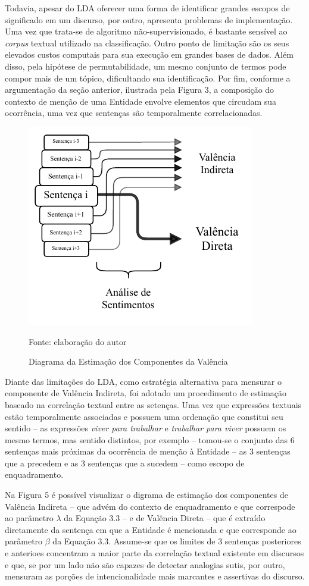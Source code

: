 \documentclass[
12pt,				%
openright,			%
twoside,			%
a4paper,			%
english,			%
french,				%
spanish,			%
brazil				%
]{abntex2}
\begin{document}
Todavia, apesar do LDA oferecer uma forma de identificar grandes escopos de significado em um discurso, por outro, apresenta problemas de implementação. Uma vez que trata-se de algoritmo não-supervisionado, é bastante sensível ao \emph{corpus} textual utilizado na classificação. Outro ponto de limitação são os seus elevados custos computais para sua execução em grandes bases de dados. Além disso, pela hipótese de permutabilidade, um mesmo conjunto de termos pode compor mais de um tópico, dificultando sua identificação. Por fim, conforme a argumentação da seção anterior, ilustrada pela Figura 3, a composição do contexto de menção de uma Entidade envolve elementos que circudam sua ocorrência, uma vez que sentenças são temporalmente correlacionadas. 
 
\begin{figure}[h]
	\caption{Diagrama da Estimação dos Componentes da Valência}
	\label{fig:diagram_op}
	\centering
	\includegraphics[width=0.5\linewidth]{figures/estimacao_valencia}
	
	Fonte: elaboração do autor
\end{figure}
 
Diante das limitações do LDA, como estratégia alternativa para mensurar o componente de Valência Indireta, foi adotado um procedimento de estimação baseado na correlação textual entre as setenças. Uma vez que expressões textuais estão temporalmente associadas e possuem uma ordenação que constitui seu sentido -- as expressões \textit{viver para trabalhar} e \textit{trabalhar para viver} possuem os mesmo termos, mas sentido distintos, por exemplo -- tomou-se o conjunto das 6 sentenças mais próximas da ocorrência de menção à Entidade -- as 3 sentenças que a precedem e as 3 sentenças que a sucedem -- como escopo de enquadramento. 

Na Figura 5 é possível visualizar o digrama de estimação dos componentes de Valência Indireta -- que advém do contexto de enquadramento e que correspode ao parâmetro $\lambda$ da Equação 3.3 -- e de Valência Direta -- que é extraído diretamente da sentença em que a Entidade é mencionada e que corresponde ao parâmetro $\beta$ da Equação 3.3. Assume-se que os limites de 3 sentenças posteriores e anterioes concentram a maior parte da correlação textual existente em discursos e que, se por um lado não são capazes de detectar analogias sutis, por outro, mensuram as porções de intencionalidade mais marcantes e assertivas do discurso.
 
\end{document}
